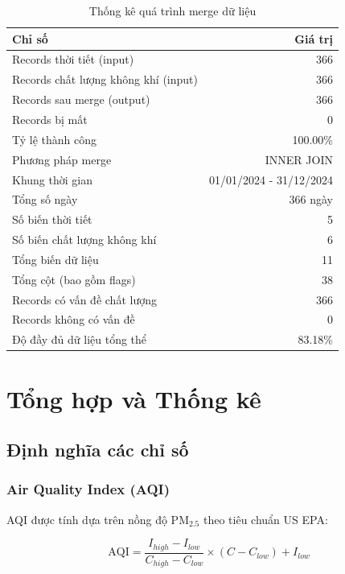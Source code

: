 \documentclass[12pt,a4paper]{article}
\newcommand{\pmtwofive}{PM$_{2.5}$}
\begin{document}
\begin{table}[H]
\centering
\caption{Thống kê quá trình merge dữ liệu}
\label{tab:merge-summary}
\begin{tabular}{lr}
\toprule
\textbf{Chỉ số} & \textbf{Giá trị} \\
\midrule
Records thời tiết (input) & 366 \\
Records chất lượng không khí (input) & 366 \\
Records sau merge (output) & 366 \\
Records bị mất & 0 \\
Tỷ lệ thành công & 100.00\% \\
\midrule
Phương pháp merge & INNER JOIN \\
Khung thời gian & 01/01/2024 - 31/12/2024 \\
Tổng số ngày & 366 ngày \\
\midrule
Số biến thời tiết & 5 \\
Số biến chất lượng không khí & 6 \\
Tổng biến dữ liệu & 11 \\
Tổng cột (bao gồm flags) & 38 \\
\midrule
Records có vấn đề chất lượng & 366 \\
Records không có vấn đề & 0 \\
Độ đầy đủ dữ liệu tổng thể & 83.18\% \\
\bottomrule
\end{tabular}
\end{table}

\section{Tổng hợp và Thống kê}

\subsection{Định nghĩa các chỉ số}

\subsubsection{Air Quality Index (AQI)}
AQI được tính dựa trên nồng độ \pmtwofive{} theo tiêu chuẩn US EPA:

\begin{equation}
\text{AQI} = \frac{I_{high} - I_{low}}{C_{high} - C_{low}} \times (C - C_{low}) + I_{low}
\end{equation}
\end{document}
